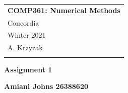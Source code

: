 \documentclass[letterpaper,12pt]{article} %
\begin{document}

\thispagestyle{empty} %

\begin{tabular}{p{15.5cm}} %
{\large \bf COMP361: Numerical Methods} \\
Concordia \\ Winter 2021 \\ A. Krzyzak \\
\hline %
\\
\end{tabular} %

\vspace*{0.3cm} %

\begin{center} %
	{\Large \bf Assignment 1} %
	\vspace{2mm}
	
	{\bf Amiani Johns 26388620}
		
\end{center}  

\vspace{0.4cm}


\end{document}
